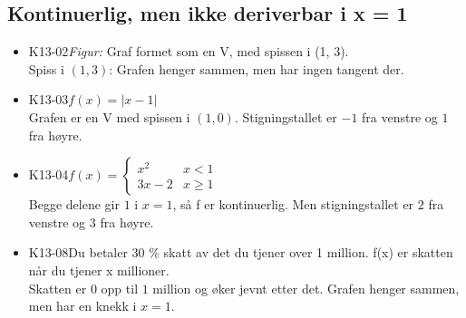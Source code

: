 \documentclass[11pt,a4paper]{article}
\begin{document}
\subsection*{Kontinuerlig, men ikke deriverbar i x = 1}
\begin{itemize}[leftmargin=1.2em, itemsep=0.35em]
\item \textsf{\small K13-02}\quad \emph{Figur:} Graf formet som en V, med spissen i (1, 3).\\{\small\color{dempet}Spiss i $(1, 3)$: Grafen henger sammen, men har ingen tangent der.}
\item \textsf{\small K13-03}\quad $f(x) = |x - 1|$\\{\small\color{dempet}Grafen er en V med spissen i $(1, 0)$. Stigningstallet er $-1$ fra venstre og $1$ fra høyre.}
\item \textsf{\small K13-04}\quad $f(x) = \begin{cases} x^2 & x < 1 \\ 3x - 2 & x \geq 1 \end{cases}$\\{\small\color{dempet}Begge delene gir $1$ i $x = 1$, så f er kontinuerlig. Men stigningstallet er $2$ fra venstre og $3$ fra høyre.}
\item \textsf{\small K13-08}\quad Du betaler 30 \% skatt av det du tjener over 1 million. f(x) er skatten når du tjener x millioner.\\{\small\color{dempet}Skatten er $0$ opp til $1$ million og øker jevnt etter det. Grafen henger sammen, men har en knekk i $x = 1$.}
\end{itemize}
\end{document}
